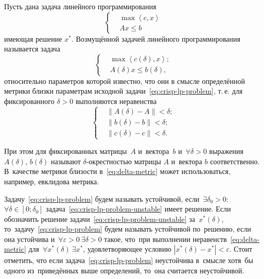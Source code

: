 Пусть дана задача линейного программирования
\begin{equation}
\label{eq:crisp-lp-problem}
  \left\{ \begin{aligned}
    & \max \left\langle c,x \right\rangle \\ 
    & Ax\leqslant b
  \end{aligned} \right.
\end{equation}
имеющая решение $x^{*}$. Возмущённой задачей линейного программирования называется задача
\begin{equation}
\label{eq:crisp-lp-problem-unstable}
  \left\{ \begin{aligned}
    & \max \left\langle c\left(\delta \right),x \right\rangle; \\ 
    & A\left( \delta  \right)x\leqslant b\left(\delta \right),
  \end{aligned} \right.
\end{equation}
относительно параметров которой известно, что они в смысле определённой метрики близки параметрам исходной задачи~\eqref{eq:crisp-lp-problem}, т.\,е. для фиксированного $\delta>0$ выполняются неравенства
\begin{equation}
\label{eq:delta-metric}
  \left\{ \begin{aligned}
    & \left\| A\left( \delta  \right)-A \right\|<\delta; \\ 
    & \left\| b\left( \delta  \right)-b \right\|<\delta; \\ 
    & \left\| c\left( \delta  \right)-c \right\|<\delta.
  \end{aligned} \right.
\end{equation}

При этом для фиксированных матрицы~$A$ и~вектора~$b$ и~$\forall \delta >\text{0}$ выражения $A\left(\delta \right)$, $b\left(\delta \right)$ называют $\delta$-окрестностью матрицы $A$ и~вектора $b$ соответственно. В~качестве метрики близости в~\eqref{eq:delta-metric} может использоваться, например, евклидова метрика.

Задачу~\eqref{eq:crisp-lp-problem} будем называть устойчивой, если~$\exists \delta_0 > 0$: $\forall \delta \in \left[ 0; \delta_0 \right]$  задача~\eqref{eq:crisp-lp-problem-unstable} имеет решение. Если обозначить решение задачи~\eqref{eq:crisp-lp-problem-unstable} за~$x^{*} \left(\delta \right)$, то~задачу~\eqref{eq:crisp-lp-problem} будем называть устойчивой по~решению, если она устойчива и~$\forall \varepsilon>0\ \exists \delta > 0$ такое, что~при выполнении неравенств~\eqref{eq:delta-metric} для~$\forall x^{*} \left(\delta \right)\ \exists x^{*}$, удовлетворяющее условию $\left| x^{*}\left(\delta \right)- x^{*} \right| < \varepsilon$. Стоит отметить, что если задача~\eqref{eq:crisp-lp-problem} неустойчива в~смысле хотя~бы одного из~приведённых выше определений, то~она считается неустойчивой.

